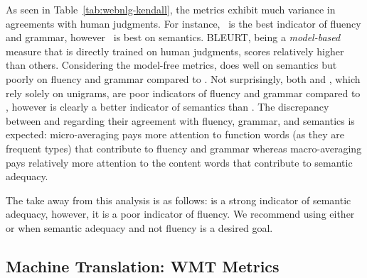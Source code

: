 As seen in Table~\ref{tab:webnlg-kendall}, the metrics exhibit much variance in agreements with human judgments. %
For instance, \blrtmd\ is the best indicator of fluency and grammar, however \blrtmn\ is best on semantics. 
BLEURT, being a \textit{model-based} measure that is directly trained on human judgments, scores relatively higher than others.
Considering the model-free metrics,  does well on semantics but poorly on fluency and grammar compared to \bleu.
Not surprisingly, both  and , which rely solely on unigrams, are poor indicators of fluency and grammar compared to \bleu, however  is clearly a better indicator of semantics than \bleu. 
The discrepancy between  and  regarding their agreement with fluency, grammar, and semantics is expected: micro-averaging pays more attention to function words (as they are frequent types) that contribute to fluency and grammar whereas macro-averaging pays relatively more attention to the content words that contribute to semantic adequacy. 

The take away from this analysis is as follows:  is a strong indicator of semantic adequacy, however, it is a poor indicator of fluency. We recommend using either  or  when semantic adequacy and not fluency is a desired goal.

\subsection{Machine Translation: WMT Metrics}
\label{sec:wmt-metrics}

